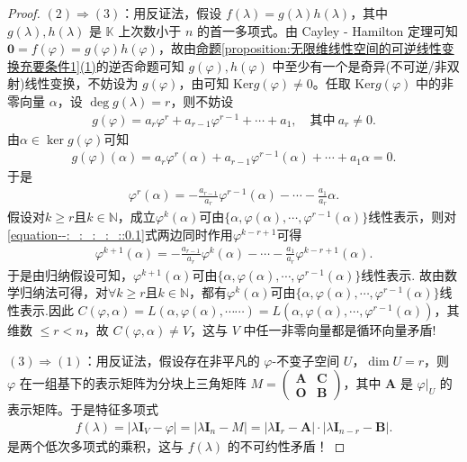 \documentclass[../../main.tex]{subfiles}
\begin{document}
\begin{proof}
$(2)\Rightarrow(3)$：用反证法，假设 $f(\lambda)=g(\lambda)h(\lambda)$，其中 $g(\lambda),h(\lambda)$ 是 $\mathbb{K}$ 上次数小于 $n$ 的首一多项式。由 Cayley - Hamilton 定理可知 $\mathbf{0}=f(\varphi)=g(\varphi)h(\varphi)$，故由\hyperref[proposition:无限维线性空间的可逆线性变换充要条件1]{命题\ref{proposition:无限维线性空间的可逆线性变换充要条件1}(1)}的逆否命题可知 $g(\varphi),h(\varphi)$ 中至少有一个是奇异(不可逆/非双射)线性变换，不妨设为 $g(\varphi)$，由可知 $\mathrm{Ker}g(\varphi)\neq 0$。任取 $\mathrm{Ker}g(\varphi)$ 中的非零向量 $\alpha$，设 $\deg g(\lambda)=r$，则不妨设
\begin{align*}
g(\varphi) = a_r \varphi^r + a_{r-1} \varphi^{r-1} + \cdots + a_1, \quad \text{其中} \ a_r \neq 0.
\end{align*}
由$\alpha \in \ker g(\varphi)$可知
\begin{align*}
g(\varphi)(\alpha) = a_r \varphi^r(\alpha) + a_{r-1} \varphi^{r-1}(\alpha) + \cdots + a_1 \alpha = 0.
\end{align*}
于是
\begin{align}
\varphi^r(\alpha) = -\frac{a_{r-1}}{a_r} \varphi^{r-1}(\alpha) - \cdots - \frac{a_1}{a_r} \alpha. \label{equation--:_:_:_:_::0.1}
\end{align}
假设对$k \geqslant  r$且$k \in \mathbb{N}$，成立$\varphi^k(\alpha)$可由$\{ \alpha, \varphi(\alpha), \cdots, \varphi^{r-1}(\alpha) \}$线性表示，则对\eqref{equation--:_:_:_:_::0.1}式两边同时作用$\varphi^{k-r+1}$可得
\begin{align*}
\varphi^{k+1}(\alpha) = -\frac{a_{r-1}}{a_r} \varphi^k(\alpha) - \cdots - \frac{a_1}{a_r} \varphi^{k-r+1}(\alpha).
\end{align*}
于是由归纳假设可知，$\varphi^{k+1}(\alpha)$可由$\{ \alpha, \varphi(\alpha), \cdots, \varphi^{r-1}(\alpha) \}$线性表示. 故由数学归纳法可得，对$\forall k \geqslant  r$且$k \in \mathbb{N}$，都有$\varphi^k(\alpha)$可由$\{ \alpha, \varphi(\alpha), \cdots, \varphi^{r-1}(\alpha) \}$线性表示.因此
$C(\varphi ,\alpha )=L(\alpha ,\varphi (\alpha ),\cdots \cdots )=L(\alpha ,\varphi (\alpha ),\cdots ,\varphi ^{r-1}(\alpha ))$，其维数 $\leqslant  r < n$，故 $C(\varphi,\alpha)\neq V$，这与 $V$ 中任一非零向量都是循环向量矛盾!

$(3)\Rightarrow(1)$：用反证法，假设存在非平凡的 $\varphi$-不变子空间 $U$，$\dim U = r$，则 $\varphi$ 在一组基下的表示矩阵为分块上三角矩阵 $M = \begin{pmatrix}
\boldsymbol{A} & \boldsymbol{C} \\
\boldsymbol{O} & \boldsymbol{B}
\end{pmatrix}$，其中 $\boldsymbol{A}$ 是 $\varphi|_U$ 的表示矩阵。于是特征多项式
\begin{align*}
f(\lambda)=|\lambda\boldsymbol{I}_V - \varphi|=|\lambda\boldsymbol{I}_n - M|=|\lambda\boldsymbol{I}_r - \boldsymbol{A}|\cdot|\lambda\boldsymbol{I}_{n - r} - \boldsymbol{B}|.
\end{align*}
是两个低次多项式的乘积，这与 $f(\lambda)$ 的不可约性矛盾！
\end{proof}
\end{document}
